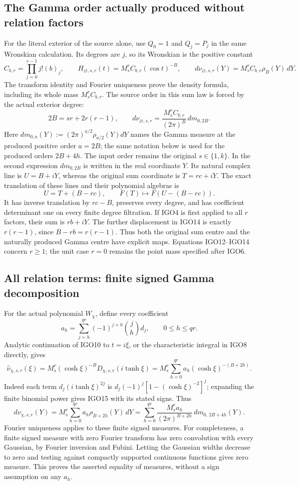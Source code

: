 \subsection{The Gamma order actually produced without relation factors}
For the literal exterior of the source alone, use $Q_0=1$ and
$Q_j=P_j$ in the same Wronskian calculation. Its degrees are
$j$, so its Wronskian is the positive constant
\[
 C_{b,r}=\prod_{j=0}^{r-1}j!(b)_j,\qquad
 H_{\varnothing,s,r}(t)=M_s^r C_{b,r}(\cos t)^{-B},
 \qquad
 d\nu_{\varnothing,s,r}(Y)=M_s^r C_{b,r}\rho_B(Y)\,dY.
 \tag{IGO12}
\]
The transform identity and Fourier uniqueness prove the density
formula, including its whole mass $M_s^r C_{b,r}$. The source
order in this sum law is forced by the actual exterior degree:
\[
 2B=sr+2r(r-1),\qquad
 d\nu_{\varnothing,s,r}
    =\frac{M_s^r C_{b,r}}{(2\pi)^B}\,dm_{0,2B}.
 \tag{IGO13}
\]
Here $dm_{0,a}(Y):=(2\pi)^{a/2}\rho_{a/2}(Y)dY$ names
the Gamma measure at the produced positive order $a=2B$;
the same notation below is used for the produced orders $2B+4h$.
The input order remains the original $s\in\{1,k\}$.
In the second expression $dm_{0,2B}$ is written in the real
coordinate $Y$. Its natural complex line is $U=B+iY$, whereas
the original sum coordinate is $T=rc+iY$. The exact translation
of these lines and their polynomial algebras is
\[
 U=T+(B-rc),\qquad
 F(T)\longmapsto F(U-(B-rc)).
 \tag{IGO14}
\]
It has inverse translation by $rc-B$, preserves every degree,
and has coefficient determinant one on every finite degree
filtration. If IGO4 is first applied to all $r$ factors, their
sum is $rb+iY$. The further displacement in IGO14 is exactly
$r(r-1)$, since $B-rb=r(r-1)$. Thus both the original sum centre
and the naturally produced Gamma centre have explicit maps.
Equations IGO12--IGO14 concern $r\geq1$; the unit case $r=0$
remains the point mass specified after IGO6.

\subsection{All relation terms: finite signed Gamma decomposition}
For the actual polynomial $W_\chi$, define every coefficient
\[
 a_h=\sum_{j=h}^{qr}(-1)^{j+h}\binom{j}{h}d_j,
 \qquad 0\leq h\leq qr.
 \tag{IGO15}
\]
Analytic continuation of IGO10 to $t=i\xi$, or the characteristic
integral in IGO8 directly, gives
\[
 \widehat\nu_{\chi,s,r}(\xi)
 =M_s^r(\cosh\xi)^{-B}D_{\chi,s,r}(i\tanh\xi)
 =M_s^r\sum_{h=0}^{qr}a_h(\cosh\xi)^{-(B+2h)}.
 \tag{IGO16}
\]
Indeed each term $d_j(i\tanh\xi)^{2j}$ is
$d_j(-1)^j[1-(\cosh\xi)^{-2}]^j$; expanding the finite
binomial power gives IGO15 with its stated signs. Thus
\[
 d\nu_{\chi,s,r}(Y)
  =M_s^r\sum_{h=0}^{qr}a_h\rho_{B+2h}(Y)\,dY
  =\sum_{h=0}^{qr}\frac{M_s^r a_h}{(2\pi)^{B+2h}}
                   \,dm_{0,\,2B+4h}(Y).
 \tag{IGO17}
\]
Fourier uniqueness applies to these finite signed measures. For
completeness, a finite signed measure with zero Fourier transform
has zero convolution with every Gaussian, by Fourier inversion
and Fubini. Letting the Gaussian widths decrease to zero and
testing against compactly supported continuous functions gives
zero measure. This proves the asserted equality of measures,
without a sign assumption on any $a_h$.

